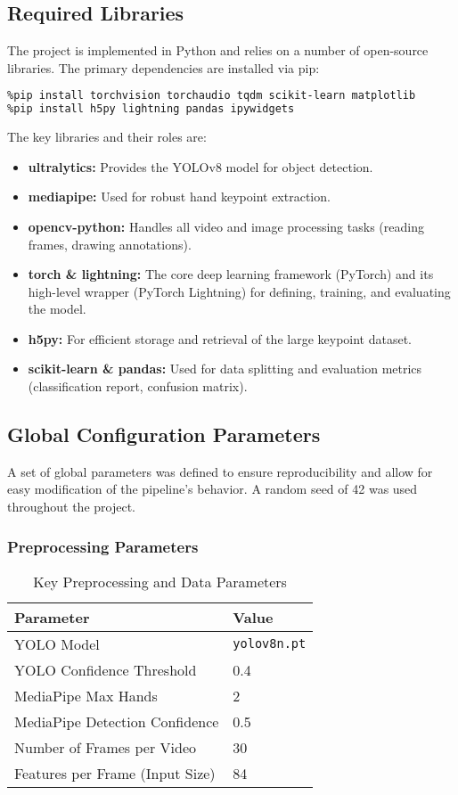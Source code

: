 \documentclass[11pt, a4paper]{article}
\begin{document}
\subsection{Required Libraries}
The project is implemented in Python and relies on a number of open-source libraries. The primary dependencies are installed via pip:
\begin{lstlisting}[language=bash]
%pip install ultralytics mediapipe opencv-python numpy torch
%pip install torchvision torchaudio tqdm scikit-learn matplotlib
%pip install h5py lightning pandas ipywidgets
\end{lstlisting}
The key libraries and their roles are:
\begin{itemize}
    \item \textbf{ultralytics:} Provides the YOLOv8 model for object detection.
    \item \textbf{mediapipe:} Used for robust hand keypoint extraction.
    \item \textbf{opencv-python:} Handles all video and image processing tasks (reading frames, drawing annotations).
    \item \textbf{torch \& lightning:} The core deep learning framework (PyTorch) and its high-level wrapper (PyTorch Lightning) for defining, training, and evaluating the model.
    \item \textbf{h5py:} For efficient storage and retrieval of the large keypoint dataset.
    \item \textbf{scikit-learn \& pandas:} Used for data splitting and evaluation metrics (classification report, confusion matrix).
\end{itemize}

\subsection{Global Configuration Parameters}
A set of global parameters was defined to ensure reproducibility and allow for easy modification of the pipeline's behavior. A random seed of 42 was used throughout the project.

\subsubsection{Preprocessing Parameters}
\begin{table}[H]
    \centering
    \caption{Key Preprocessing and Data Parameters}
    \label{tab:preprocessing_params}
    \begin{tabular}{@{}ll@{}}
        \toprule
        \textbf{Parameter} & \textbf{Value} \\ \midrule
        YOLO Model & \texttt{yolov8n.pt} \\
        YOLO Confidence Threshold & 0.4 \\
        MediaPipe Max Hands & 2 \\
        MediaPipe Detection Confidence & 0.5 \\
        Number of Frames per Video & 30 \\
        Features per Frame (Input Size) & 84 \\ \bottomrule
    \end{tabular}
\end{table}
\end{document}
